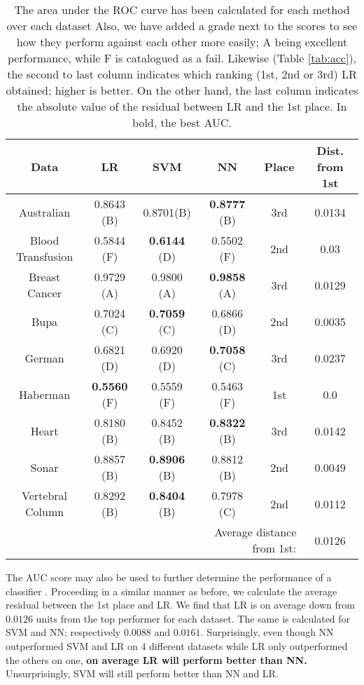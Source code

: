 \documentclass{INGUADY}
\begin{document}
\begin{table*}
\center
\setlength{\tabcolsep}{2mm}
\caption{The area under the ROC curve has been calculated for each method over each dataset Also, we have added a grade next to the scores to see how they perform against each other more easily; A being excellent performance, while F is catalogued as a fail. Likewise (Table \ref{tab:acc}), the second to last column indicates which ranking (1st, 2nd or 3rd) LR obtained; higher is better. On the other hand, the last column indicates the absolute value of the residual between LR and the 1st place. In bold, the best AUC.} \vspace{3mm}
\begin{tabular}{c|ccc|cc}
\toprule
Data & LR & SVM & NN & Place & Dist. from 1st \\
\midrule
\midrule
Australian 					& 0.8643  (B)				& 0.8701(B)					& \textbf{0.8777} (B)		& 3rd 					& 0.0134\\
Blood Transfusion 		& 0.5844  (F)				& \textbf{0.6144} (D)		& 0.5502	 (F)					& 2nd				 	& 0.03 \\
Breast Cancer 				& 0.9729  (A)				& 0.9800 (A)					& \textbf{0.9858} (A) 	& 3rd 					& 0.0129 \\
Bupa 							& 0.7024  (C)				& \textbf{0.7059} (C)		& 0.6866	(D)					& 2nd				 	& 0.0035 \\
German 						& 0.6821	  (D)				& 0.6920	(D)					& \textbf{0.7058} (C)		& 3rd 					& 0.0237 \\
Haberman 					& \textbf{0.5560} (F)	& 0.5559 (F)					& 0.5463 (F)					& 1st 					& 0.0 \\
Heart 							& 0.8180  (B)				& 0.8452	(B)					& \textbf{0.8322} (B)		& 3rd 					& 0.0142 \\
Sonar  							& 0.8857  (B)				& \textbf{0.8906} (B)		& 0.8812 (B)					& 2nd 					& 0.0049 \\
Vertebral Column 		& 0.8292  (B)				& \textbf{0.8404} (B)		& 0.7978	 (C)					& 2nd 					& 0.0112 \\
\midrule
& & & \multicolumn{2}{r}{Average distance from 1st: } & 0.0126 \\
\bottomrule
\end{tabular}
\label{tab:roc}
\end{table*}
The AUC score may also be used to further determine the performance of a classifier \cite{fawcett}. Proceeding in a similar manner as before, we calculate the average residual between the 1st place and LR. We find that LR is on average down from $0.0126$ units from the top performer for each dataset. The same is calculated for SVM and NN; respectively $0.0088$ and $0.0161$. Surprisingly, even though NN outperformed SVM and LR on 4 different datasets while LR only outperformed the others on one, \textbf{on average LR will perform better than NN.} Unsurprisingly, SVM will still perform better than NN and LR. 
\end{document}
